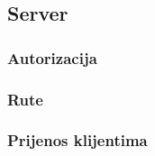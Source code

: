 \subsection{Server}

\subsubsection{Autorizacija}

\subsubsection{Rute}

\subsubsection{Prijenos klijentima}
